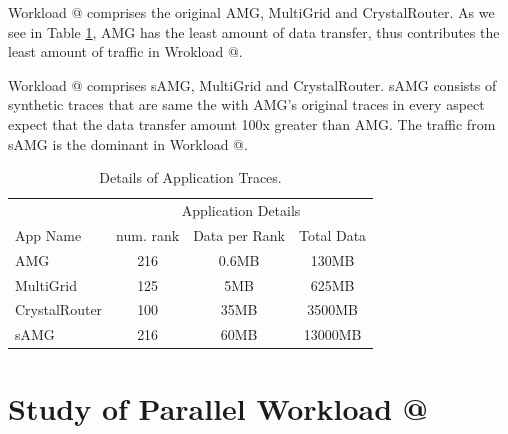 \documentclass[conference,compsoc]{IEEEtran}
\makeatletter
\newcommand{\Rmnum}[1]{\expandafter\@slowromancap\romannumeral #1@}
\makeatother
\begin{document}
Workload \Rmnum{1} comprises the original AMG, MultiGrid and CrystalRouter. As we see in Table \ref{tab:apps-detail}, AMG has the least amount of data transfer, thus contributes the least amount of traffic in Wrokload \Rmnum{1}.

Workload \Rmnum{2} comprises sAMG, MultiGrid and CrystalRouter. sAMG consists of synthetic traces that are same the with AMG's original traces in every aspect expect that the data transfer amount 100x greater than AMG. The traffic from sAMG is the dominant in Workload \Rmnum{2}.


\begin{table}[ht]
\begin{center}
\caption{Details of Application Traces.} 
\label{tab:apps-detail}
\begin{tabular}{l c c c }
\toprule %
\toprule
&\multicolumn{3}{c}{Application Details} \\ %
\cmidrule(l){2-4}
App Name & num. rank & Data per Rank & Total Data\\ %
\midrule %
AMG  &    216 &   0.6MB   &     130MB\\ %
\midrule
MultiGrid  &    125 &   5MB   &     625MB\\ 
\midrule
CrystalRouter  &   100  &  35MB    &     3500MB\\ 
\midrule
sAMG  &    216 &   60MB   &     13000MB\\ %
\midrule %
\bottomrule %
\end{tabular}
\end{center}
\end{table}


\section{Study of Parallel Workload \Rmnum{1 }}
\label{sec:workload-1}

\end{document}
